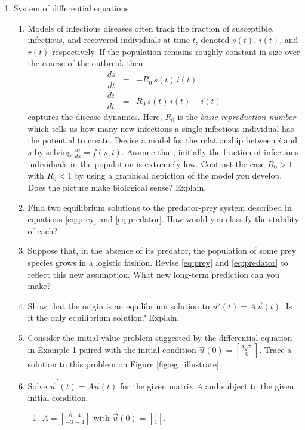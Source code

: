 \documentclass[11pt]{article}
\begin{document}
\begin{enumerate}
  \item System of differential equations
    \begin{enumerate}
      \item Models of infectious diseases often track the fraction of susceptible, infectious, and recovered individuals at time $t$, denoted $s(t)$, $i(t)$, and $r(t)$  respectively. If the population remains roughly constant in size over the course of the outbreak 
        then
        \[
          \begin{array}{lcl}
            \dfrac{ds}{dt} &=& - R_0\, s(t)\, i(t) 
            \\[2ex]
            \dfrac{di}{dt} &=& R_0\, s(t)\, i(t) - i(t)
          \end{array}
        \]   
        captures the disease dynamics. Here, $R_0$ is the \emph{basic reproduction number} which tells us how many new infections a single infectious individual has the potential to create. Devise a model for the relationship between $i$ and $s$ by solving $\frac{di}{ds} = f(s,i)$. Assume that, initially the fraction of infectious individuals in the population is extremely low. Contrast the case $R_0 > 1$ with $R_0<1$ by using a graphical depiction of the model you develop. Does the picture make biological sense? Explain.
      \item Find two equilibrium solutions to the predator-prey system described in equations \eqref{eq:prey} and \eqref{eq:predator}. How would you classify the stability of each?
      \item Suppose that, in the absence of its predator, the population of some prey species grows in a logistic fashion. Revise \eqref{eq:prey} and \eqref{eq:predator} to reflect this new assumption. What new long-term prediction can you make?
      \item Show that the origin is an equilibrium solution to $\vec{u}'(t) = A\, \vec{u}(t)$. Is it the only equilibrium solution? Explain.
      \item Consider the initial-value problem suggested by the differential equation in Example 1 paired with the initial condition $\vec{u}(0) = {2\sqrt{5}\brack 0}$. Trace a solution to this problem on Figure \ref{fig:eg_illustrate}.
      \item Solve $\vec{u}^{\,\prime}(t) = A\vec{u}(t)$ for the given matrix $A$ and subject to the given initial condition.
        \begin{enumerate}
          \item[(a)] $A={6\quad 4\brack -3\ -1}$ with $\vec{u}(0) = {1\brack 1}$.

\end{enumerate}
\end{enumerate}
\end{enumerate}
\end{document}
